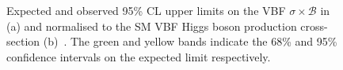 \begin{figure}

  \caption{Expected and observed 95\% \ac{CL} upper limits on the \ac{VBF} $\sigma\times\mathcal{B}$ in \pb (a) and normalised to the SM \ac{VBF} Higgs boson production cross-section (b)~\cite{Chatrchyan:2014tja}. The green and yellow bands indicate the 68\% and 95\% confidence intervals on the expected limit respectively.}
  \label{fig:promptlimits}
\end{figure}
